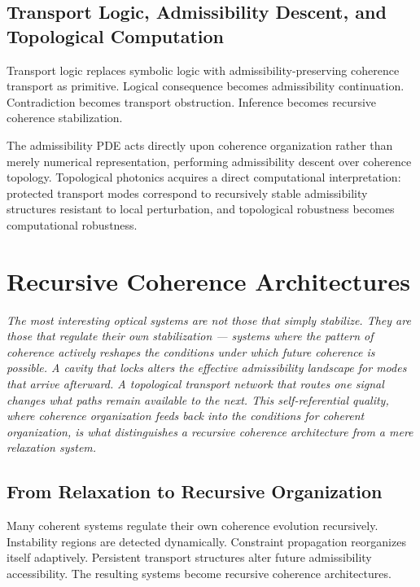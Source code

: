 \documentclass[11pt,openany]{book}
\theoremstyle{definition}
\theoremstyle{plain}
\begin{document}
\section{Transport Logic, Admissibility Descent, and Topological Computation}

Transport logic replaces symbolic logic with admissibility-preserving coherence transport as primitive. Logical consequence becomes admissibility continuation. Contradiction becomes transport obstruction. Inference becomes recursive coherence stabilization.

The admissibility PDE acts directly upon coherence organization rather than merely numerical representation, performing admissibility descent over coherence topology. Topological photonics acquires a direct computational interpretation: protected transport modes correspond to recursively stable admissibility structures resistant to local perturbation, and topological robustness becomes computational robustness.


\chapter{Recursive Coherence Architectures}

\noindent\textit{The most interesting optical systems are not those that simply stabilize. They are those that regulate their own stabilization --- systems where the pattern of coherence actively reshapes the conditions under which future coherence is possible. A cavity that locks alters the effective admissibility landscape for modes that arrive afterward. A topological transport network that routes one signal changes what paths remain available to the next. This self-referential quality, where coherence organization feeds back into the conditions for coherent organization, is what distinguishes a recursive coherence architecture from a mere relaxation system.}

\bigskip

\section{From Relaxation to Recursive Organization}

Many coherent systems regulate their own coherence evolution recursively. Instability regions are detected dynamically. Constraint propagation reorganizes itself adaptively. Persistent transport structures alter future admissibility accessibility. The resulting systems become recursive coherence architectures.
\end{document}
